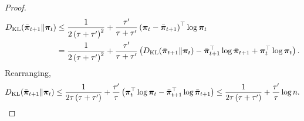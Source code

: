 \begin{proof}
\begin{equation*}
\begin{split}
    D_{\mathrm{KL}}{\left( \bar{{\boldsymbol{\pi}}}_{t+1} \middle\| {\boldsymbol{\pi}}_t \right)} &\le \frac{1}{2\left(\tau + \tau^\prime\right)^2} + \frac{\tau^\prime}{\tau + \tau^\prime} \left( {\boldsymbol{\pi}}_t - \bar{{\boldsymbol{\pi}}}_{t+1} \right)^\top \log{{\boldsymbol{\pi}}_t} \\
    &= \frac{1}{2\left(\tau + \tau^\prime\right)^2} + \frac{\tau^\prime}{\tau + \tau^\prime} \left( D_{\mathrm{KL}}{\left( \bar{{\boldsymbol{\pi}}}_{t+1} \middle\| {\boldsymbol{\pi}}_t \right)} - \bar{{\boldsymbol{\pi}}}_{t+1}^\top \log{\bar{{\boldsymbol{\pi}}}_{t+1}} + {\boldsymbol{\pi}}_t^\top \log{{\boldsymbol{\pi}}_t} \right). 
\end{split}
\end{equation*}
Rearranging,
\begin{equation*}
\begin{split}
    D_{\mathrm{KL}}{\left( \bar{{\boldsymbol{\pi}}}_{t+1} \middle\| {\boldsymbol{\pi}}_t \right)} \le \frac{1}{2\tau \left(\tau + \tau^\prime\right)} + \frac{\tau^\prime}{\tau} \left( {\boldsymbol{\pi}}_t^\top \log{{\boldsymbol{\pi}}_t} -  \bar{{\boldsymbol{\pi}}}_{t+1}^\top \log{\bar{{\boldsymbol{\pi}}}_{t+1}}  \right) \le \frac{1}{2\tau \left(\tau + \tau^\prime\right)} + \frac{\tau^\prime}{\tau} \log{n}. \qedhere
\end{split}
\end{equation*}
\end{proof}


